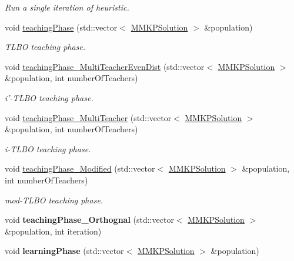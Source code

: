 \begin{DoxyCompactItemize}
\begin{DoxyCompactList}\small\item\em Run a single iteration of heuristic. \end{DoxyCompactList}\item 
void \hyperlink{class_m_m_k_p___t_l_b_o_ab18aa71ce62a00663cedb6d7d8db6f38}{teaching\+Phase} (std\+::vector$<$ \hyperlink{class_m_m_k_p_solution}{M\+M\+K\+P\+Solution} $>$ \&population)
\begin{DoxyCompactList}\small\item\em T\+L\+B\+O teaching phase. \end{DoxyCompactList}\item 
void \hyperlink{class_m_m_k_p___t_l_b_o_a5421bce054c4197a536dfa374fda1653}{teaching\+Phase\+\_\+\+Multi\+Teacher\+Even\+Dist} (std\+::vector$<$ \hyperlink{class_m_m_k_p_solution}{M\+M\+K\+P\+Solution} $>$ \&population, int number\+Of\+Teachers)
\begin{DoxyCompactList}\small\item\em i'-\/\+T\+L\+B\+O teaching phase. \end{DoxyCompactList}\item 
void \hyperlink{class_m_m_k_p___t_l_b_o_a2e2ea3990fb62d5117672b278ec21e7e}{teaching\+Phase\+\_\+\+Multi\+Teacher} (std\+::vector$<$ \hyperlink{class_m_m_k_p_solution}{M\+M\+K\+P\+Solution} $>$ \&population, int number\+Of\+Teachers)
\begin{DoxyCompactList}\small\item\em i-\/\+T\+L\+B\+O teaching phase. \end{DoxyCompactList}\item 
void \hyperlink{class_m_m_k_p___t_l_b_o_af54ae5e4da4275df8d25eaaa916e3b01}{teaching\+Phase\+\_\+\+Modified} (std\+::vector$<$ \hyperlink{class_m_m_k_p_solution}{M\+M\+K\+P\+Solution} $>$ \&population, int number\+Of\+Teachers)
\begin{DoxyCompactList}\small\item\em mod-\/\+T\+L\+B\+O teaching phase. \end{DoxyCompactList}\item 
\hypertarget{class_m_m_k_p___t_l_b_o_a6377147784c758b4f8e782b37f86be73}{void {\bfseries teaching\+Phase\+\_\+\+Orthognal} (std\+::vector$<$ \hyperlink{class_m_m_k_p_solution}{M\+M\+K\+P\+Solution} $>$ \&population, int iteration)}\label{class_m_m_k_p___t_l_b_o_a6377147784c758b4f8e782b37f86be73}

\item 
\hypertarget{class_m_m_k_p___t_l_b_o_ae230bdd3c27355b3b89c23ba3de2cb29}{void {\bfseries learning\+Phase} (std\+::vector$<$ \hyperlink{class_m_m_k_p_solution}{M\+M\+K\+P\+Solution} $>$ \&population)}\label{class_m_m_k_p___t_l_b_o_ae230bdd3c27355b3b89c23ba3de2cb29}


\end{DoxyCompactItemize}
